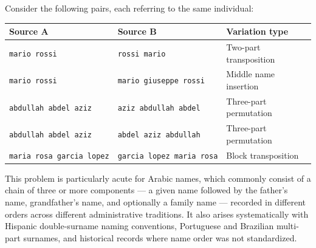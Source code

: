 \documentclass[
  11pt,
]{article}
\newcounter{none} %
\begin{document}
Consider the following pairs, each referring to the same individual:

{\def\LTcaptype{none} %
\begin{longtable}[]{@{}
  >{\raggedright\arraybackslash}p{}
  >{\raggedright\arraybackslash}p{}
  >{\raggedright\arraybackslash}p{}@{}}
\toprule\noalign{}
\begin{minipage}[b]{\linewidth}\raggedright
Source A
\end{minipage} & \begin{minipage}[b]{\linewidth}\raggedright
Source B
\end{minipage} & \begin{minipage}[b]{\linewidth}\raggedright
Variation type
\end{minipage} \\
\midrule\noalign{}
\endhead
\bottomrule\noalign{}
\endlastfoot
\texttt{mario\ rossi} & \texttt{rossi\ mario} & Two-part
transposition \\
\texttt{mario\ rossi} & \texttt{mario\ giuseppe\ rossi} & Middle name
insertion \\
\texttt{abdullah\ abdel\ aziz} & \texttt{aziz\ abdullah\ abdel} &
Three-part permutation \\
\texttt{abdullah\ abdel\ aziz} & \texttt{abdel\ aziz\ abdullah} &
Three-part permutation \\
\texttt{maria\ rosa\ garcia\ lopez} &
\texttt{garcia\ lopez\ maria\ rosa} & Block transposition \\
\end{longtable}
}

This problem is particularly acute for Arabic names, which commonly
consist of a chain of three or more components --- a given name followed
by the father's name, grandfather's name, and optionally a family name
--- recorded in different orders across different administrative
traditions. It also arises systematically with Hispanic double-surname
naming conventions, Portuguese and Brazilian multi-part surnames, and
historical records where name order was not standardized.
\end{document}
